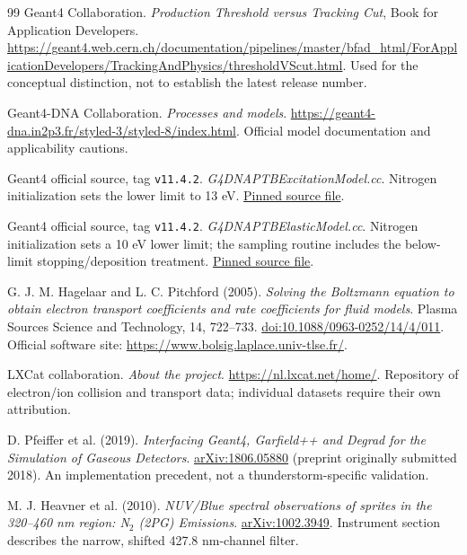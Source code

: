 \documentclass[11pt,a4paper]{article}
\begin{document}
\begin{thebibliography}{99}
Geant4 Collaboration.
\emph{Production Threshold versus Tracking Cut}, Book for Application Developers.
\url{https://geant4.web.cern.ch/documentation/pipelines/master/bfad_html/ForApplicationDevelopers/TrackingAndPhysics/thresholdVScut.html}.
Used for the conceptual distinction, not to establish the latest release number.

Geant4-DNA Collaboration. \emph{Processes and models}.
\url{https://geant4-dna.in2p3.fr/styled-3/styled-8/index.html}.
Official model documentation and applicability cautions.

Geant4 official source, tag \texttt{v11.4.2}.
\emph{G4DNAPTBExcitationModel.cc}.
Nitrogen initialization sets the lower limit to 13 eV.
\href{https://raw.githubusercontent.com/Geant4/geant4/v11.4.2/source/processes/electromagnetic/dna/models/src/G4DNAPTBExcitationModel.cc}{Pinned source file}.

Geant4 official source, tag \texttt{v11.4.2}.
\emph{G4DNAPTBElasticModel.cc}.
Nitrogen initialization sets a 10 eV lower limit; the sampling routine includes the below-limit stopping/deposition treatment.
\href{https://raw.githubusercontent.com/Geant4/geant4/v11.4.2/source/processes/electromagnetic/dna/models/src/G4DNAPTBElasticModel.cc}{Pinned source file}.

G. J. M. Hagelaar and L. C. Pitchford (2005).
\emph{Solving the Boltzmann equation to obtain electron transport coefficients and rate coefficients for fluid models}.
Plasma Sources Science and Technology, 14, 722--733.
\href{https://doi.org/10.1088/0963-0252/14/4/011}{doi:10.1088/0963-0252/14/4/011}.
Official software site: \url{https://www.bolsig.laplace.univ-tlse.fr/}.

LXCat collaboration. \emph{About the project}.
\url{https://nl.lxcat.net/home/}.
Repository of electron/ion collision and transport data; individual datasets require their own attribution.

D. Pfeiffer et al. (2019).
\emph{Interfacing Geant4, Garfield++ and Degrad for the Simulation of Gaseous Detectors}.
\href{https://arxiv.org/abs/1806.05880}{arXiv:1806.05880} (preprint originally submitted 2018).
An implementation precedent, not a thunderstorm-specific validation.

M. J. Heavner et al. (2010).
\emph{NUV/Blue spectral observations of sprites in the 320--460 nm region: N$_2$ (2PG) Emissions}.
\href{https://arxiv.org/abs/1002.3949}{arXiv:1002.3949}.
Instrument section describes the narrow, shifted 427.8 nm-channel filter.


\end{thebibliography}
\end{document}
